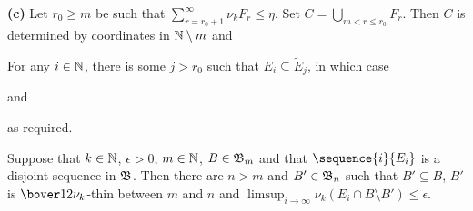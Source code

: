 {\medskip

{\bf (c)} Let $r_0\ge m$ be such that
$\sum_{r=r_0+1}^{\infty}\nu_kF_r\le\eta$.   Set
$C=\bigcup_{m<r\le r_0}F_r$.   Then
$C$ is determined by coordinates in $\Bbb N\setminus m$ and


\noindent For any $i\in\Bbb N$, there is some $j>r_0$ such that
$E_i\subseteq\tilde E_j$, in which case


\noindent and


\noindent as required.
}  %

Suppose that $k\in\Bbb N$, $\epsilon>0$, $m\in\Bbb N$,
$B\in\frak B_m$ and that
$\sequence{i}{E_i}$ is a disjoint sequence in $\frak B$.   Then there
are $n>m$ and $B'\in\frak B_n$ such that $B'\subseteq B$, $B'$ is
$\bover12\nu_k$-thin between $m$ and $n$ and
$\limsup_{i\to\infty}\nu_k(E_i\cap B\setminus B')\le\epsilon$.

